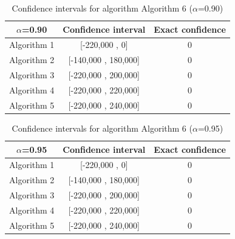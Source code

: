 \documentclass[a4paper,10pt]{article}
\begin{document}
\begin{table}[!htp]
\centering\small
\begin{tabular}{
|c|c|c|}
\hline
 $\alpha$=0.90 & Confidence interval & Exact confidence \\ \hline 
Algorithm 1 & [-220,000 , 0] & 0\\ \hline 
Algorithm 2 & [-140,000 , 180,000] & 0\\ \hline 
Algorithm 3 & [-220,000 , 200,000] & 0\\ \hline 
Algorithm 4 & [-220,000 , 220,000] & 0\\ \hline 
Algorithm 5 & [-220,000 , 240,000] & 0\\ \hline 

\end{tabular}
\caption{Confidence intervals for algorithm Algorithm 6 ($\alpha$=0.90)}
\end{table}
\begin{table}[!htp]
\centering\small
\begin{tabular}{
|c|c|c|}
\hline
 $\alpha$=0.95 & Confidence interval & Exact confidence \\ \hline 
Algorithm 1 & [-220,000 , 0] & 0\\ \hline 
Algorithm 2 & [-140,000 , 180,000] & 0\\ \hline 
Algorithm 3 & [-220,000 , 200,000] & 0\\ \hline 
Algorithm 4 & [-220,000 , 220,000] & 0\\ \hline 
Algorithm 5 & [-220,000 , 240,000] & 0\\ \hline 

\end{tabular}
\caption{Confidence intervals for algorithm Algorithm 6 ($\alpha$=0.95)}
\end{table}

 \clearpage 
\end{document}
